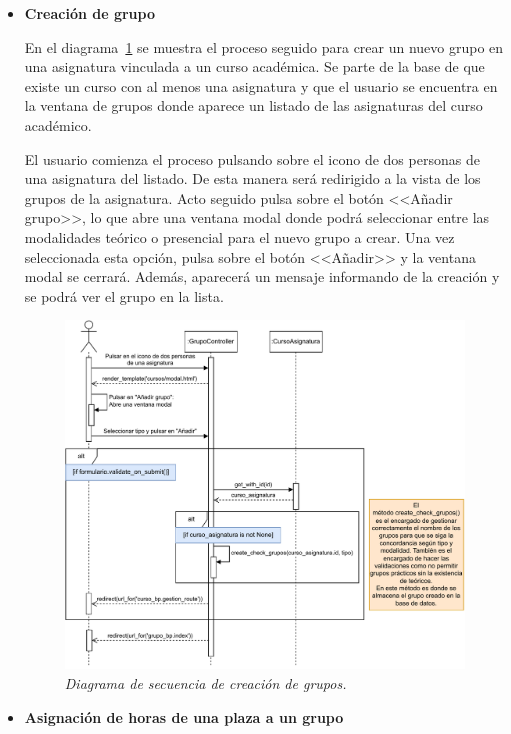 \begin{itemize}
\item \textbf{Creación de grupo}

En el diagrama~\ref{DS-crearGrupo} se muestra el proceso seguido para crear un nuevo grupo en una asignatura vinculada a un curso académica. Se parte de la base de que existe un curso con al menos una asignatura y que el usuario se encuentra en la ventana de grupos donde aparece un listado de las asignaturas del curso académico.

El usuario comienza el proceso pulsando sobre el icono de dos personas de una asignatura del listado. De esta manera será redirigido a la vista de los grupos de la asignatura. Acto seguido pulsa sobre el botón <<Añadir grupo>>, lo que abre una ventana modal donde podrá seleccionar entre las modalidades teórico o presencial para el nuevo grupo a crear. Una vez seleccionada esta opción, pulsa sobre el botón <<Añadir>> y la ventana modal se cerrará. Además, aparecerá un mensaje informando de la creación y se podrá ver el grupo en la lista.

\begin{figure}
	\centering
	\includegraphics[width=\textwidth]{../img/Anexos/Diagramas secuencia/DS - crear grupo.pdf}
	\caption{\textit{Diagrama de secuencia de creación de grupos.}}\label{DS-crearGrupo}
\end{figure}

\item \textbf{Asignación de horas de una plaza a un grupo}


\end{itemize}
